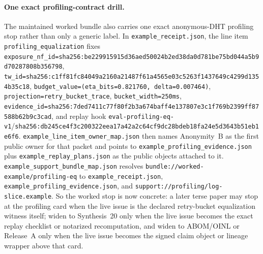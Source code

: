 \documentclass[11pt]{article}
\begin{document}
\paragraph{One exact profiling-contract drill.}
The maintained worked bundle also carries one exact anonymous-DHT profiling stop rather than only a generic label.
In \nolinkurl{example\_receipt.json}, the line item \nolinkurl{profiling\_equalization} fixes \nolinkurl{exposure\_nf\_id=sha256:be229915915d36aed50024b2ed38da0d781be75bd044a5b9d70287808b356798}, \nolinkurl{tw\_id=sha256:c1ff81fc84049a2160a21487f61a4565e03c5263f1437649c4299d1354b35c18}, \nolinkurl{budget\_value=(eta\_bits=0.821760, delta=0.007464)}, \nolinkurl{projection=retry\_bucket\_trace}, \nolinkurl{bucket\_width=250ms}, \nolinkurl{evidence\_id=sha256:7ded7411c77f80f2b3a674baff4e137807e3c1f769b2399ff87588b62b9c3cad}, and replay hook \nolinkurl{eval-profiling-eq-v1}/\nolinkurl{sha256:db245ce4f3c200322eea17a42a2c64cf9dc28bdeb18fa24e5d3643b51eb1e6f6}.
\nolinkurl{example\_line\_item\_owner\_map.json} then names Anonymity~B as the first public owner for that packet and points to \nolinkurl{example\_profiling\_evidence.json} plus \nolinkurl{example\_replay\_plans.json} as the public objects attached to it.
\nolinkurl{example\_support\_bundle\_map.json} resolves \nolinkurl{bundle://worked-example/profiling-eq} to \nolinkurl{example\_receipt.json}, \nolinkurl{example\_profiling\_evidence.json}, and \nolinkurl{support://profiling/log-slice.example}.
So the worked stop is now concrete: a later terse paper may stop at the profiling card when the live issue is the declared retry-bucket equalization witness itself; widen to Synthesis~20 only when the live issue becomes the exact replay checklist or notarized recomputation, and widen to ABOM/OINL or Release~A only when the live issue becomes the signed claim object or lineage wrapper above that card.\cite{series:profiling,series:replayrecipe,series:abomoinl,series:releaseproperty}
\end{document}
